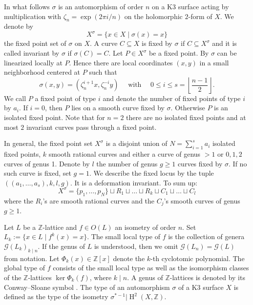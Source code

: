 \documentclass[a4paper]{amsart}
\theoremstyle{definition}
\theoremstyle{plain}
\DeclareMathOperator{\HH}{H}
\newcommand{\ZZ}{\mathbb{Z}}
\newcommand{\G}{\mathcal{G}}
\begin{document}
In what follows $\sigma$ is an automorphism of order $n$ on a K3 surface acting by multiplication with $\zeta_n = \exp(2 \pi i/n)$ on the holomorphic $2$-form of $X$.
We denote by
\[X^\sigma = \{x \in X \mid \sigma(x) = x\}\]
the fixed point set of $\sigma$ on $X$.
A curve $C \subseteq X$ is fixed by $\sigma$ if $C \subseteq X^\sigma$ and it is called invariant
by $\sigma$ if $\sigma(C) = C$.
Let $P \in X^\sigma$ be a fixed point. By \cite[lemme 1]{cartan1954} $\sigma$ can be linearized locally at $P$. Hence there are local coordinates $(x,y)$ in a small neighborhood centered at $P$ such that
\[\sigma(x,y) = (\zeta_n^{i+1}x,\zeta_n^{-i} y)\quad \mbox{  with } \quad 0 \leq i \leq s = \left\lfloor\frac{n-1}{2}\right\rfloor.\]
We call $P$ a fixed point of type $i$ and denote the number of fixed points of type $i$ by $a_i$.
If $i = 0$, then $P$ lies on a smooth curve fixed by $\sigma$. Otherwise $P$ is an isolated fixed point. Note that for $n=2$ there are no isolated fixed points and at most $2$ invariant curves pass through a fixed point.

In general, the fixed point set $X^\sigma$ is a disjoint union of $N = \sum_{i=1}^s a_i$ isolated fixed points, $k$ smooth rational curves and either a curve of genus $>1$
or $0, 1, 2$ curves of genus 1.
Denote by $l$ the number of genus $g \geq 1$ curves fixed by $\sigma$. If no such curve is fixed, set $g=1$. We describe the fixed locus by the tuple
$((a_1, \dots, a_s), k, l, g)$. It is a deformation invariant.
To sum up:
\[X^\sigma = \{p_1, \dots, p_N\} \sqcup R_1 \sqcup \dots \sqcup R_k \sqcup C_1 \sqcup \dots \sqcup C_l\]
where the $R_i$'s are smooth rational curves and the $C_j$'s smooth curves of genus $g \geq 1$.


Let $L$ be a $\ZZ$-lattice and $f\in O(L)$ an isometry of order $n$.
Set $L_k:=\{x \in L \mid f^k(x)=x\}$.
The small local type of $f$ is the collection of genera $\G(L_k)_{k \mid n}$. If the genus of $L$ is understood, then we omit $\G(L_n)=\G(L)$ from notation.
Let $\Phi_k(x)\in \ZZ[x]$ denote the $k$-th cyclotomic polynomial.
The global type of $f$ consists of the small local type as well as the isomorphism classes of the $\ZZ$-lattices $\ker \Phi_k(f)$, where $k \mid n$. A genus of $\ZZ$-lattices is denoted by its Conway--Sloane symbol \cite{splag}. The type of an automorphism $\sigma$ of a K3 surface $X$ is defined as the type of the isometry $\sigma^{*-1}|\HH^2(X,\ZZ)$.
\end{document}
